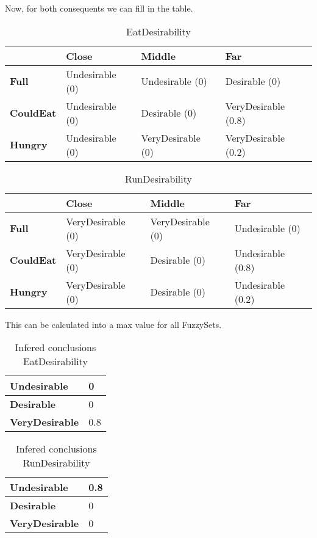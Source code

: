 Now, for both consequents we can fill in the table.
\begin{table}[ht]
    \centering
    \label{EatDesirabilityCaseOne}
    \begin{tabular}{|l|l|l|l|}
        \hline
                          & \textbf{Close}    & \textbf{Middle}     & \textbf{Far}           \\ \hline
        \textbf{Full}     & Undesirable (0)   & Undesirable   (0)   & Desirable     (0)   \\ \hline
        \textbf{CouldEat} & Undesirable (0)   & Desirable     (0)   & VeryDesirable (0.8) \\ \hline
        \textbf{Hungry}   & Undesirable (0)   & VeryDesirable (0)   & VeryDesirable (0.2) \\ \hline
    \end{tabular}
    \caption{EatDesirability}
\end{table}
\begin{table}[ht]
    \centering
    \label{RunDesirabilityCaseOne}
    \begin{tabular}{|l|l|l|l|}
        \hline
                          & \textbf{Close}      & \textbf{Middle}     & \textbf{Far}\\ \hline
        \textbf{Full}     & VeryDesirable (0)   & VeryDesirable (0)   & Undesirable (0)   \\ \hline
        \textbf{CouldEat} & VeryDesirable (0)   & Desirable     (0)   & Undesirable (0.8) \\ \hline
        \textbf{Hungry}   & VeryDesirable (0)   & Desirable     (0)   & Undesirable (0.2) \\ \hline
    \end{tabular}
    \caption{RunDesirability}
\end{table}
This can be calculated into a max value for all FuzzySets.
\begin{table}[ht]
    \centering
    \label{InferedConclusionsEatDesirability}
    \begin{tabular}{|l|l|}
        \hline
        \textbf{Undesirable}   & 0   \\ \hline
        \textbf{Desirable}     & 0   \\ \hline
        \textbf{VeryDesirable} & 0.8 \\ \hline
    \end{tabular}
    \caption{Infered conclusions EatDesirability}
\end{table}
\begin{table}[ht]
    \centering
    \label{InferedConclusionsRunDesirability}
    \begin{tabular}{|l|l|}
        \hline
        \textbf{Undesirable}   & 0.8   \\ \hline
        \textbf{Desirable}     & 0     \\ \hline
        \textbf{VeryDesirable} & 0     \\ \hline
    \end{tabular}
    \caption{Infered conclusions RunDesirability}
\end{table}
